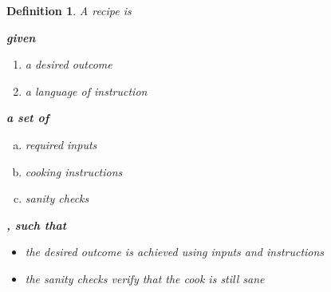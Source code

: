 \documentclass{beamer}
\newtheorem{deff}{Definition}
\newcommand{\mypar}[1]{\textbf{#1}}
\begin{document}
\begin{frame}
\begin{deff}

A recipe is 

\mypar{given}
\begin{enumerate}
\item a desired outcome
\item a language of instruction
\end{enumerate} 
\mypar{a set of}
\begin{enumerate}[a.]
\item required inputs
\item cooking instructions 
\item sanity checks
\end{enumerate}
\mypar{, such that}
\begin{itemize}
\item the desired outcome is achieved using inputs and instructions
\item the sanity checks verify that the cook is still sane
\end{itemize}

\end{deff}
\end{frame}
\end{document}
